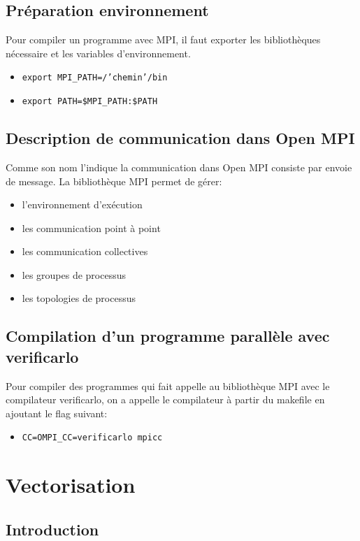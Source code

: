 \documentclass[11pt]{article}
\begin{document}
\subsection{Préparation environnement}
\label{sec:org868dce8}
Pour compiler un programme avec MPI, il faut exporter les bibliothèques nécessaire et les variables d'environnement.

\begin{itemize}
\item \texttt{export MPI\_PATH=/'chemin'/bin}
\item \texttt{export PATH=\$MPI\_PATH:\$PATH}
\end{itemize}
\subsection{Description de communication dans Open MPI}
\label{sec:orga0b4215}
Comme son nom l'indique la communication dans Open MPI consiste par envoie de message.
La bibliothèque MPI permet de gérer:
\begin{itemize}
\item l'environnement d'exécution
\item les communication point à point
\item les communication collectives
\item les groupes de processus
\item les topologies de processus
\end{itemize}
\subsection{Compilation d'un programme parallèle avec verificarlo}
\label{sec:orgcece1a3}
Pour compiler des programmes qui fait appelle au bibliothèque MPI avec le compilateur verificarlo, on a appelle le compilateur à partir du makefile en ajoutant le flag suivant:

\begin{itemize}
\item \texttt{CC=OMPI\_CC=verificarlo mpicc}
\end{itemize}
\section{Vectorisation}
\label{sec:org40bc469}
\subsection{Introduction}
\label{sec:orga03e7b2}
\end{document}
